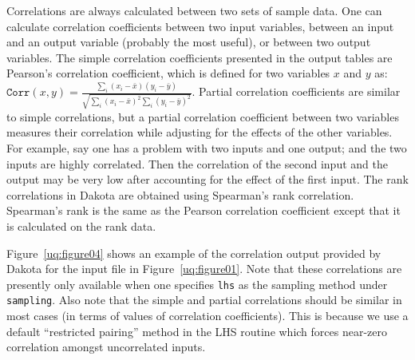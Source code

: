 Correlations are always calculated between two sets of sample data.
One can calculate correlation coefficients between two input
variables, between an input and an output variable (probably the most
useful), or between two output variables. The simple correlation
coefficients presented in the output tables are Pearson's correlation
coefficient, which is defined for two variables $x$ and $y$ as:
$\mathtt{Corr}(x,y) = \frac{\sum_{i}(x_{i}-\bar{x})(y_{i}-\bar{y})}
{\sqrt{\sum_{i}(x_{i}-\bar{x})^2\sum_{i}(y_{i}-\bar{y})^2}}$.
Partial correlation coefficients are similar to simple correlations,
but a partial correlation coefficient between two variables measures
their correlation while adjusting for the effects of the other
variables. For example, say one has a problem with two inputs and one
output; and the two inputs are highly correlated. Then the
correlation of the second input and the output may be very low after
accounting for the effect of the first input. The rank correlations
in Dakota are obtained using Spearman's rank correlation. Spearman's
rank is the same as the Pearson correlation coefficient except that it
is calculated on the rank data.

Figure~\ref{uq:figure04} shows an example of the correlation output
provided by Dakota for the input file in Figure~\ref{uq:figure01}.
Note that these correlations are presently only available when one
specifies \texttt{lhs} as the sampling method under \texttt{sampling}.
Also note that the simple and partial correlations should be similar in most
cases (in terms of values of correlation coefficients). This is
because we use a default ``restricted pairing'' method in the LHS
routine which forces near-zero correlation amongst uncorrelated
inputs.


